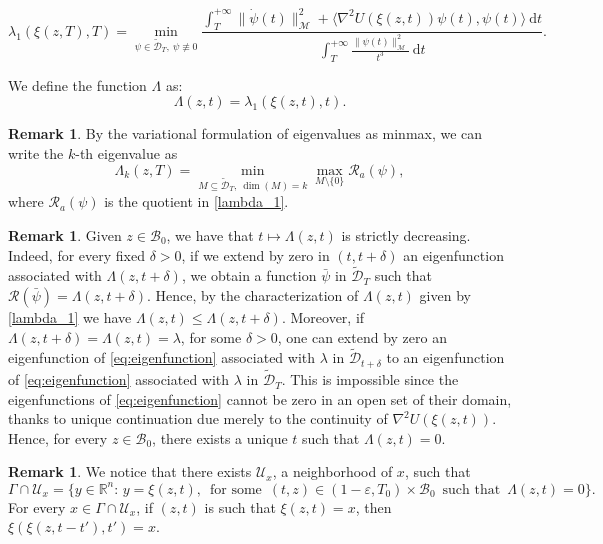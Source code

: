 \documentclass[a4paper,10pt]{amsart}
\newcommand{\ud}{\mathrm{d}}
\theoremstyle{plain}
\theoremstyle{definition}
\newtheorem{rem}[thm]{Remark}
\numberwithin{equation}{section}
\numberwithin{thm}{section}
\begin{document}
\begin{equation}\label{lambda_1}
\lambda_1(\xi(z,T),T) = \min_{\psi\in\tilde{\mathcal{D}}_{T},\ \psi\not\equiv0} \frac{\int_{T}^{+\infty}\|\dot{\psi}(t)\|_\mathcal{M}^2+\langle  \nabla^2 U(\xi(z,t))\psi(t),\psi(t)\rangle\ \ud t}{\int_{T}^{+\infty}\frac{\|\psi(t)\|_\mathcal{M}^2}{t^3}\ \ud t}.
\end{equation}

We define the function $\Lambda$ as:
\[
\Lambda(z,t)= \lambda_1(\xi(z,t),t).
\] 


\smallskip
\begin{rem}
By the variational formulation of eigenvalues as minmax, we can write the $k$-th eigenvalue as
\[
\Lambda_k(z,T) = \min_{M\subseteq \tilde{\mathcal D}_T,\ \dim(M)=k} \max_{M\setminus\{0\}} \mathcal{R}_a(\psi),
\]
where $\mathcal{R}_a(\psi)$ is the quotient in \eqref{lambda_1}.
\end{rem}

\begin{rem}
Given $z \in \mathcal B_0$, we have that $t \mapsto \Lambda(z,t)$ is strictly decreasing. Indeed, for every fixed $\delta >0$, if we extend by zero in $(t,t+\delta)$  an eigenfunction associated with $\Lambda(z,t+\delta)$, we obtain a function $\bar \psi$ in $\tilde{\mathcal D}_T$ such that $\mathcal R(\bar \psi)=\Lambda(z,t+\delta)$. Hence, by the characterization of $\Lambda(z,t)$ given by \eqref{lambda_1} we have $\Lambda(z,t)\le \Lambda(z,t+\delta)$. Moreover,
if $\Lambda(z,t+\delta)=\Lambda(z,t)=\lambda$, for some $\delta>0$, one can extend by zero an eigenfunction of \eqref{eq:eigenfunction} associated with $\lambda$ in $\tilde{\mathcal{D}}_{t+\delta}$ to an eigenfunction of \eqref{eq:eigenfunction} associated with $\lambda$ in $\tilde{\mathcal D}_T$. This is impossible since the eigenfunctions of \eqref{eq:eigenfunction} cannot be zero in an open set of their domain, thanks to unique continuation due merely to the continuity of $\nabla^2 U(\xi(z,t))$. Hence, for every $z \in \mathcal B_0$, there exists a unique $t$ such that $\Lambda(z,t)=0$.
\end{rem}

\begin{rem}
    We notice that there exists $\mathcal{U}_x$, a neighborhood of $x$, such that 
    \[
    \Gamma \cap \mathcal{U}_x = \{y \in \mathbb R^n:\,  y = \xi(z,t) , \, \mbox{ for some } \, (t,z) \in (1-\varepsilon, T_0)\times \mathcal{B}_0\, \mbox{ such that } \, \Lambda(z,t)=0 \}.
    \]
    For every $x \in \Gamma \cap \mathcal U_x$, if $(z,t)$ is such that $\xi(z,t) =x$, then $\xi(\xi(z,t-t'),t')=x$. 
\end{rem}
\end{document}
